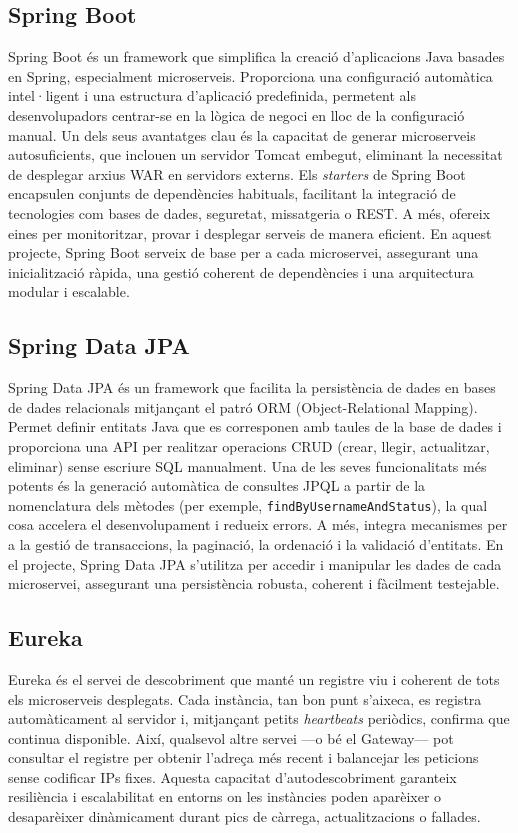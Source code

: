 \subsection*{Spring Boot}
Spring Boot és un framework que simplifica la creació d'aplicacions Java basades en Spring, especialment microserveis. Proporciona una configuració automàtica intel·ligent i una estructura d'aplicació predefinida, permetent als desenvolupadors centrar-se en la lògica de negoci en lloc de la configuració manual. Un dels seus avantatges clau és la capacitat de generar microserveis autosuficients, que inclouen un servidor Tomcat embegut, eliminant la necessitat de desplegar arxius WAR en servidors externs. Els \emph{starters} de Spring Boot encapsulen conjunts de dependències habituals, facilitant la integració de tecnologies com bases de dades, seguretat, missatgeria o REST. A més, ofereix eines per monitoritzar, provar i desplegar serveis de manera eficient. En aquest projecte, Spring Boot serveix de base per a cada microservei, assegurant una inicialització ràpida, una gestió coherent de dependències i una arquitectura modular i escalable.

\subsection*{Spring Data JPA}
Spring Data JPA és un framework que facilita la persistència de dades en bases de dades relacionals mitjançant el patró ORM (Object-Relational Mapping). Permet definir entitats Java que es corresponen amb taules de la base de dades i proporciona una API per realitzar operacions CRUD (crear, llegir, actualitzar, eliminar) sense escriure SQL manualment. Una de les seves funcionalitats més potents és la generació automàtica de consultes JPQL a partir de la nomenclatura dels mètodes (per exemple, \texttt{findByUsernameAndStatus}), la qual cosa accelera el desenvolupament i redueix errors. A més, integra mecanismes per a la gestió de transaccions, la paginació, la ordenació i la validació d'entitats. En el projecte, Spring Data JPA s'utilitza per accedir i manipular les dades de cada microservei, assegurant una persistència robusta, coherent i fàcilment testejable.

\subsection*{Eureka}

Eureka és el servei de descobriment que manté un registre viu i coherent de tots els microserveis desplegats.  
Cada instància, tan bon punt s'aixeca, es registra automàticament al servidor i, mitjançant petits \emph{heartbeats} periòdics, confirma que continua disponible. Així, qualsevol altre servei —o bé el Gateway— pot consultar el registre per obtenir l'adreça més recent i balancejar les peticions sense codificar IPs fixes. Aquesta capacitat d'autodescobriment garanteix resiliència i escalabilitat en entorns on les instàncies poden aparèixer o desaparèixer dinàmicament durant pics de càrrega, actualitzacions o fallades.


